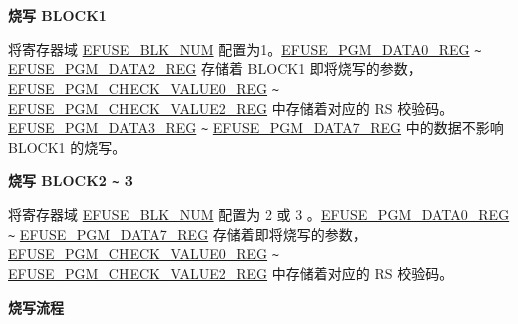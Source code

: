 \documentclass[main\_\_CN.tex]{subfiles}
\begin{document}
{\bfseries 烧写 BLOCK1}

将寄存器域 \hyperref[fielddesc:EFUSEBLKNUM]{EFUSE\_BLK\_NUM} 配置为1。\hyperref[regdesc:EFUSEPGMDATA0REG]{EFUSE\_PGM\_DATA0\_REG} \verb+~+ \hyperref[regdesc:EFUSEPGMDATA5REG]{EFUSE\_PGM\_DATA2\_REG} 存储着 BLOCK1 即将烧写的参数，\hyperref[regdesc:EFUSEPGMCHECKVALUE0REG]{EFUSE\_PGM\_CHECK\_VALUE0\_REG} \verb+~+ \hyperref[regdesc:EFUSEPGMCHECKVALUE2REG]{EFUSE\_PGM\_CHECK\_VALUE2\_REG} 中存储着对应的 RS 校验码。\hyperref[regdesc:EFUSEPGMDATA6REG]{EFUSE\_PGM\_DATA3\_REG} \verb+~+ \hyperref[regdesc:EFUSEPGMDATA7REG]{EFUSE\_PGM\_DATA7\_REG} 中的数据不影响 BLOCK1 的烧写。

{\bfseries 烧写 BLOCK2 \verb+~+ 3}

将寄存器域 \hyperref[fielddesc:EFUSEBLKNUM]{EFUSE\_BLK\_NUM} 配置为 2 或 3 。\hyperref[regdesc:EFUSEPGMDATA0REG]{EFUSE\_PGM\_DATA0\_REG} \verb+~+ \hyperref[regdesc:EFUSEPGMDATA7REG]{EFUSE\_PGM\_DATA7\_REG} 存储着即将烧写的参数，\hyperref[regdesc:EFUSEPGMCHECKVALUE0REG]{EFUSE\_PGM\_CHECK\_VALUE0\_REG}  \verb+~+ \hyperref[regdesc:EFUSEPGMCHECKVALUE2REG]{EFUSE\_PGM\_CHECK\_VALUE2\_REG} 中存储着对应的 RS 校验码。

{\bfseries 烧写流程}
\end{document}
